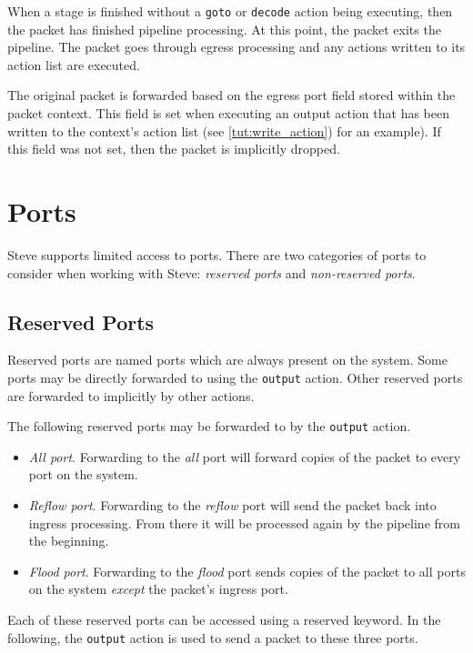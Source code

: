 When a stage is finished without a \texttt{goto} or \texttt{decode}
action being executing, then the packet has finished pipeline
processing.
At this point, the packet exits the pipeline.
The packet goes through egress processing and any actions written to its action list are executed.

The original packet is forwarded based on the egress port field stored
within the packet context. This field is set when executing an
output action that has been written to the context's action list
(see \ref{tut:write_action}) for an example). If this field was not set,
then the packet is implicitly dropped.

\section{Ports} \label{tut:ports}

Steve supports limited access to ports.
There are two categories of ports to consider when working with Steve: 
\textit{reserved ports} and
\textit{non-reserved ports}.

\subsection {Reserved Ports} \label{tut:reserved_ports}

Reserved ports are named ports which are always present on the system. Some ports may
be directly forwarded to using the \texttt{output} action. Other reserved ports 
are forwarded to implicitly by other actions.

The following reserved ports may be forwarded to by the \texttt{output} action.

\begin{itemize}
\item \emph{All port}. Forwarding to the \textit{all} port will forward copies of the packet to
every port on the system.

\item \emph{Reflow port}. Forwarding to the \textit{reflow} port will send the packet back into
ingress processing. From there it will be processed again by the pipeline from
the beginning.

\item \emph{Flood port}. Forwarding to the \textit{flood} port sends copies of the packet to all
ports on the system \textit{except} the packet's ingress port.
\end{itemize}

Each of these reserved ports can be accessed using a reserved keyword. In the
following, the \texttt{output} action is used to send a packet to these three
ports.

